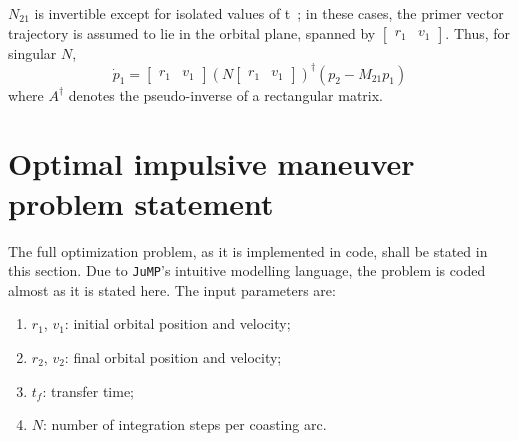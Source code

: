 \(N_{21}\) is invertible except for isolated values of t~\cite{Conway_2010}; in these cases, the primer vector trajectory is assumed to lie in the orbital plane, spanned by \(\begin{bmatrix}
    r_1 & v_1
\end{bmatrix}\). Thus, for singular \(N\),
\begin{equation}
    \dot p_1 = \begin{bmatrix}
        r_1 & v_1
    \end{bmatrix} (N \begin{bmatrix}
        r_1 & v_1
    \end{bmatrix})^\dagger \left(p_2 - M_{21}p_1\right)
\end{equation}
where \(A^\dagger\) denotes the pseudo-inverse of a rectangular matrix.

\section{Optimal impulsive maneuver problem statement}\label{sec:impulsive_statement}

The full optimization problem, as it is implemented in code, shall be stated in this section. Due to \texttt{JuMP}'s intuitive modelling language, the problem is coded almost as it is stated here. The input parameters are:
\begin{enumerate}
    \item \(r_1\), \(v_1\): initial orbital position and velocity;
    \item \(r_2\), \(v_2\): final orbital position and velocity;
    \item \(t_f\): transfer time;
    \item \(N\): number of integration steps per coasting arc.
\end{enumerate}

